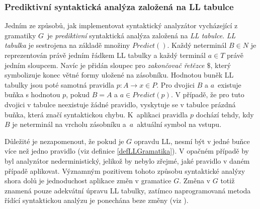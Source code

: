 \subsubsection{Prediktivní syntaktická analýza založená na LL tabulce} \label{nadpisPrediktivniSA}
Jedním ze způsobů, jak implementovat syntaktický analyzátor vycházející z gramatiky $G$~je \emph{prediktivní} syntaktická analýza založená na \emph{LL tabulce}.
\emph{LL tabulka} je sestrojena na základě množiny $Predict()$. Každý neterminál $B \in N$ je reprezentován právě jedním řádkem LL tabulky a každý
terminál $a \in T$ právě jedním sloupcem. Navíc je přidán sloupec pro \emph{zakončovač řetězce $\$$}, který symbolizuje konec větné formy uložené na zásobníku.
Hodnotou buněk LL tabulky jsou poté samotná pravidla $p\!: A \rightarrow x \in P$. Pro dvojici $B$ a $a$~existuje buňka s hodnotou $p$, pokud $B = A$ a
$a \in Predict(p)$. V případě, že pro tuto dvojici v tabulce neexistuje žádné pravidlo, vyskytuje se v tabulce prázdná buňka, která značí syntaktickou chybu. K~aplikaci pravidla $p$
dochází tehdy, kdy $B$ je neterminál na vrcholu zásobníku a~$a$~aktuální symbol na vstupu.

Důležité je nezapomenout, že pokud je $G$ opravdu LL, nesmí být v jedné buňce více než jedno pravidlo (viz definice \ref{defLLGramatika}). V opačném případě by byl analyzátor nederministický,
jelikož by nebylo zřejmé, jaké pravidlo v daném případě aplikovat. Významným pozitivem tohoto způsobu syntaktické analýzy shora dolů je jednoduchost aplikace změn v gramatice $G$. Změna v $G$ totiž znamená
pouze adekvátní úpravu LL tabulky, zatímco naprogramovaná metoda řídící syntaktickou analýzu je ponechána beze změny (viz \cite{Meduna:2008:ElementsOfCompilerDesign}).


